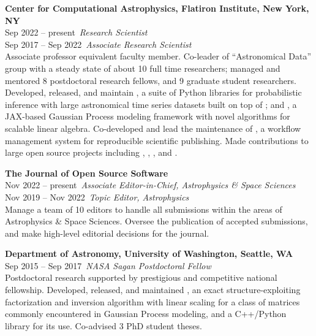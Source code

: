 \documentclass[11pt,letterpaper]{article}
\begin{document}
\begin{list}{}{\cvlist}
    \item
        \textbf{Center for Computational Astrophysics, Flatiron Institute, New
        York, NY} \\
        {\color{numcolor} Sep 2022 -- present}\,
        \emph{Research Scientist} \\
        {\color{numcolor} Sep 2017 -- Sep 2022}\,
        \emph{Associate Research Scientist} \\
        Associate professor equivalent faculty member. 
        Co-leader of ``Astronomical Data'' group with a steady state of about 10 full time researchers; managed and mentored 8 postdoctoral research fellows, and 9 graduate student researchers.
        Developed, released, and maintain \href{https://github.com/exoplanet-dev}{}, a suite of Python libraries for probabilistic inference with large astronomical time series datasets built on top of ; and \href{https://github.com/dfm/tinygp}{}, a JAX-based Gaussian Process modeling framework with novel algorithms for scalable linear algebra.
        Co-developed and lead the maintenance of \href{https://github.com/showyourwork/showyourwork}{}, a workflow management system for reproducible scientific publishing.
        Made contributions to large open source projects including , , , and .
        \\[1.5ex]

    \item
        \textbf{The Journal of Open Source Software} \\
        {\color{numcolor} Nov 2022 -- present}\,
        \emph{Associate Editor-in-Chief, Astrophysics \& Space Sciences} \\
        {\color{numcolor} Nov 2019 -- Nov 2022}\,
        \emph{Topic Editor, Astrophysics} \\
        Manage a team of 10 editors to handle all submissions within the areas of Astrophysics \& Space Sciences.
        Oversee the publication of accepted submissions, and make high-level editorial decisions for the journal.
        \\[1.5ex]

    \item
        \textbf{Department of Astronomy, University of Washington, Seattle, WA} \\
        {\color{numcolor} Sep 2015 -- Sep 2017}\,
        \emph{NASA Sagan Postdoctoral Fellow} \\
        Postdoctoral research supported by prestigious and competitive national fellowship.
        Developed, released, and maintained \href{https://github.com/dfm/celerite}{}, an exact structure-exploiting factorization and inversion algorithm with linear scaling for a class of matrices commonly encountered in Gaussian Process modeling, and a C++/Python library for its use.
        Co-advised 3 PhD student theses.
        \\[1.5ex]


\end{list}
\end{document}
